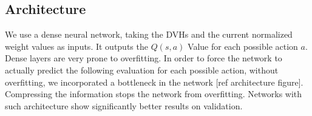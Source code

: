%
%
%
%
%
%


\subsection{Architecture}
We use a dense neural network, taking the DVHs and the current normalized weight values as inputs.
It outputs the $Q(s,a)$ Value for each possible action $a$.
Dense layers are very prone to overfitting.
In order to force the network to actually predict the following evaluation for each possible action, without overfitting, we incorporated a bottleneck in the network [ref architecture figure].
Compressing the information stops the network from overfitting.
Networks with such architecture show significantly better results on validation.

